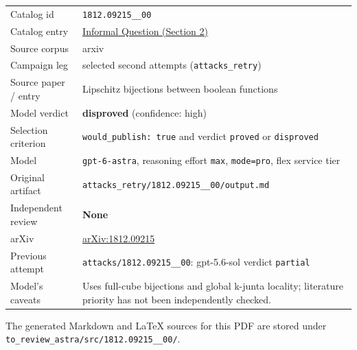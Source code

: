 \documentclass[
  11pt,
  a4paper,
]{article}
\newcounter{none} %
\begin{document}
{\def\LTcaptype{none} %
\begin{longtable}[]{@{}
  >{\raggedright\arraybackslash}p{}
  >{\raggedright\arraybackslash}p{}@{}}
\toprule\noalign{}
\endhead
\bottomrule\noalign{}
\endlastfoot
Catalog id & \texttt{1812.09215\_\_00} \\
Catalog entry &
\href{https://graph-theory-ai.github.io/graph-conjectures/arxiv/1812.09215__00/}{Informal
Question (Section 2)} \\
Source corpus & arxiv \\
Campaign leg & selected second attempts (\texttt{attacks\_retry}) \\
Source paper / entry & Lipschitz bijections between boolean functions \\
Model verdict & \textbf{disproved} (confidence: high) \\
Selection criterion & \texttt{would\_publish:\ true} and verdict
\texttt{proved} or \texttt{disproved} \\
Model & \texttt{gpt-6-astra}, reasoning effort \texttt{max},
\texttt{mode=pro}, flex service tier \\
Original artifact &
\texttt{attacks\_retry/1812.09215\_\_00/output.md} \\
Independent review & \textbf{None} \\
arXiv & \href{https://arxiv.org/abs/1812.09215}{arXiv:1812.09215} \\
Previous attempt & \texttt{attacks/1812.09215\_\_00}: gpt-5.6-sol
verdict \texttt{partial} \\
Model's caveats & Uses full-cube bijections and global k-junta locality;
literature priority has not been independently checked. \\
\end{longtable}
}

The generated Markdown and LaTeX sources for this PDF are stored under
\texttt{to\_review\_astra/src/1812.09215\_\_00/}.
\end{document}
